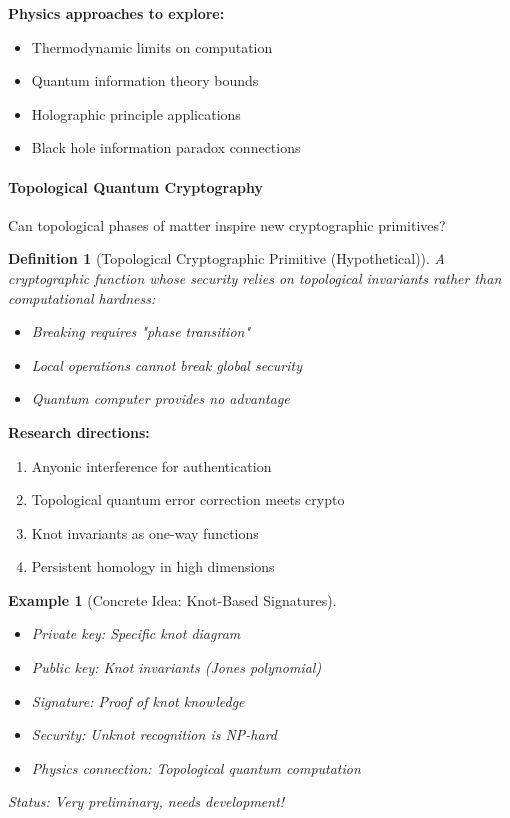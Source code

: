 \documentclass[11pt,a4paper]{article}
\newtheorem{definition}{Definition}
\newtheorem{example}{Example}
\begin{document}
\textbf{Physics approaches to explore:}
\begin{itemize}
    \item Thermodynamic limits on computation
    \item Quantum information theory bounds
    \item Holographic principle applications
    \item Black hole information paradox connections
\end{itemize}

\paragraph{Topological Quantum Cryptography}

Can topological phases of matter inspire new cryptographic primitives?

\begin{definition}[Topological Cryptographic Primitive (Hypothetical)]
A cryptographic function whose security relies on topological invariants rather than computational hardness:
\begin{itemize}
    \item Breaking requires "phase transition"
    \item Local operations cannot break global security
    \item Quantum computer provides no advantage
\end{itemize}
\end{definition}

\textbf{Research directions:}
\begin{enumerate}
    \item Anyonic interference for authentication
    \item Topological quantum error correction meets crypto
    \item Knot invariants as one-way functions
    \item Persistent homology in high dimensions
\end{enumerate}

\begin{example}[Concrete Idea: Knot-Based Signatures]
\begin{itemize}
    \item Private key: Specific knot diagram
    \item Public key: Knot invariants (Jones polynomial)
    \item Signature: Proof of knot knowledge
    \item Security: Unknot recognition is NP-hard
    \item Physics connection: Topological quantum computation
\end{itemize}
Status: Very preliminary, needs development!
\end{example}
\end{document}
